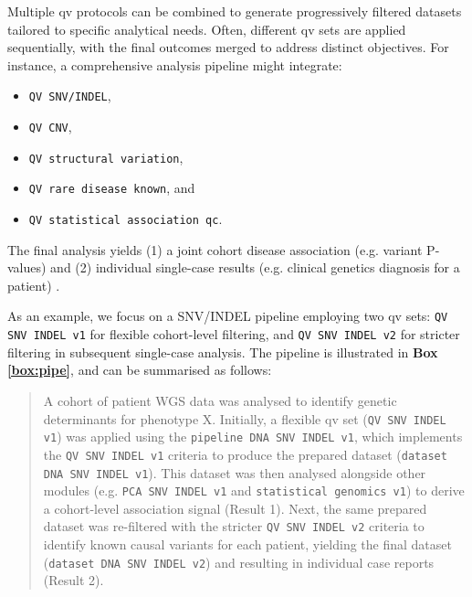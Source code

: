Multiple \ac{qv} protocols can be combined to generate progressively filtered datasets tailored to specific analytical needs. Often, different \ac{qv} sets are applied sequentially, with the final outcomes merged to address distinct objectives. For instance, a comprehensive analysis pipeline might integrate:
\begin{itemize}
  \item \colorbox{kispiblue!30}{\texttt{QV SNV/INDEL}},
  \item \colorbox{kispiblue!30}{\texttt{QV CNV}},
  \item \colorbox{kispiblue!30}{\texttt{QV structural variation}},
  \item \colorbox{kispiblue!30}{\texttt{QV rare disease known}}, and 
  \item \colorbox{kispiblue!30}{\texttt{QV statistical association \ac{qc}}}.
\end{itemize}
The final analysis yields (1) a joint cohort disease association (e.g. variant P-values) and (2) individual single-case results (e.g. clinical genetics diagnosis for a patient)
\cite{auwera_genomics_2020, li2025statistical}.

As an example, we focus on a SNV/INDEL pipeline employing two \ac{qv} sets:
\colorbox{colorSUNSET2!60}{\texttt{QV SNV INDEL v1}} for flexible cohort-level filtering, and 
\colorbox{colorSUNSET2!60}{\texttt{QV SNV INDEL v2}} for stricter filtering in subsequent single-case analysis. The pipeline is illustrated in \textbf{Box \ref{box:pipe}}, and can be summarised as follows:

\begin{quotation}
A cohort of patient WGS data was analysed to identify genetic determinants for phenotype X. Initially, a flexible \ac{qv} set (\texttt{QV SNV INDEL v1}) was applied using the 
\colorbox{colorSUNSET1!30}{\texttt{pipeline DNA SNV INDEL v1}}, which implements the \texttt{QV SNV INDEL v1} criteria to produce the prepared dataset (\colorbox{colorSUNSET3!30}{\texttt{dataset DNA SNV INDEL v1}}). This dataset was then analysed alongside other modules (e.g. \colorbox{colorSUNSET4!30}{\texttt{PCA SNV INDEL v1}} and \colorbox{colorSUNSET5!30}{\texttt{statistical genomics v1}}) to derive a cohort-level association signal (Result 1). Next, the same prepared dataset was re-filtered with the stricter \texttt{QV SNV INDEL v2} criteria to identify known causal variants for each patient, yielding the final dataset (\colorbox{colorSUNSET3!30}{\texttt{dataset DNA SNV INDEL v2}}) and resulting in individual case reports (Result 2).
\end{quotation}

